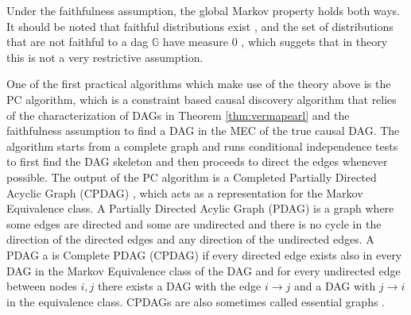 \documentclass{tufte-book}
\begin{document}
\begin{Definition}
\begin{definition}[Faithfulness]
\end{definition}

Under the faithfulness assumption, the global Markov property holds both ways. It should be noted that faithful distributions exist \cite{meek-2013-stron-compl}, and the set of distributions that are not faithful to a dag \(\mathbb{G}\) have measure \(0\) \cite{uhler-2013-geomet-faith}, which suggets that in theory this is not a very restrictive assumption.



One of the first practical algorithms which make use of the theory above is the PC algorithm, \cite{spirtes-2000-causation-prediction-search,kalisch-2007-estim-high} which is a constraint based causal discovery algorithm that relies of the characterization of DAGs in Theorem \ref{thm:vermapearl} and the faithfulness assumption to find a DAG in the MEC of the true causal DAG. The algorithm starts from a complete graph and runs conditional independence tests to first find the DAG skeleton and then proceeds to direct the edges whenever possible. The output of the PC algorithm is a Completed Partially Directed Acyclic Graph (CPDAG) \cite{meek-2013-causal-infer}, which acts as a representation for the Markov Equivalence class. A Partially Directed Acylic Graph (PDAG) is a graph where some edges are directed and some are undirected and there is no cycle in the direction of the directed edges and any direction of the undirected edges. A PDAG a is Complete PDAG (CPDAG) if every directed edge exists also in every DAG in the Markov Equivalence class of the DAG and for every undirected edge between nodes \(i,j\) there exists a DAG with the edge \(i \rightarrow j\) and a DAG with \(j \rightarrow i\) in the equivalence class. CPDAGs are also sometimes called essential graphs \cite{andersson-1997-charac-markov}.







\end{Definition}
\end{document}
